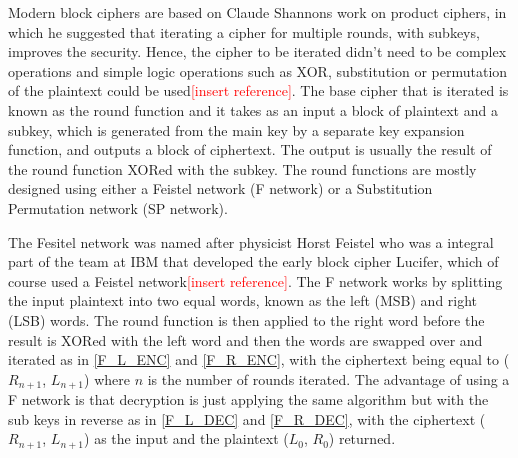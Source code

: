 \documentclass[12pt,twoside,a4paper]{report}
\begin{document}
	Modern block ciphers are based on Claude Shannons work on product ciphers\cite{Shannon1949}, in which he suggested that iterating a cipher for multiple rounds, with subkeys, improves the security. Hence, the cipher to be iterated didn't need to be complex operations and simple logic operations such as XOR, substitution or permutation of the plaintext could be used\textcolor{red}{[insert reference]}. The base cipher that is iterated is known as the round function and it takes as an input a block of plaintext and a subkey, which is generated from the main key by a separate key expansion function, and outputs a block of ciphertext. The output is usually the result of the round function XORed with the subkey. The round functions are mostly designed using either a Feistel network\cite{Feistel1973} (F network) or a Substitution Permutation network (SP network)\cite{AlfredJ.Menezes1996}.
    
	The Fesitel network was named after physicist Horst Feistel who was a integral part of the team at IBM that developed the early block cipher Lucifer, which of course used a Feistel network\textcolor{red}{[insert reference]}. The F network works by splitting the input plaintext into two equal words, known as the left (MSB) and right (LSB) words. The round function is then applied to the right word before the result is XORed with the left word and then the words are swapped over and iterated as in \autoref{F_L_ENC} and \ref{F_R_ENC}, with the ciphertext being equal to ($R_{n+1}$, $L_{n+1}$) where $n$ is the number of rounds iterated. The advantage of using a F network is that decryption is just applying the same algorithm but with the sub keys in reverse as in \autoref{F_L_DEC} and \ref{F_R_DEC}, with the ciphertext ($R_{n+1}$, $L_{n+1}$) as the input and the plaintext ($L_0$, $R_0$) returned.
    
\end{document}
